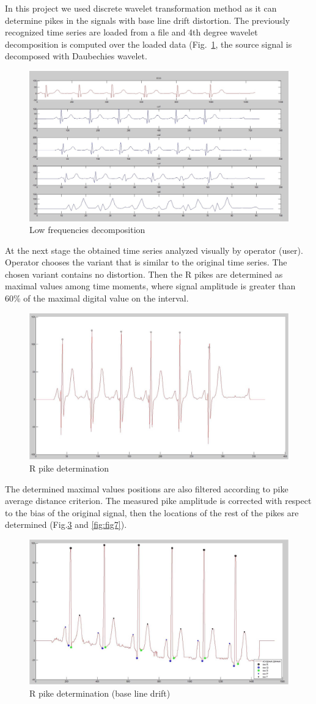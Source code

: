 \documentclass[runningheads]{AIIT}
\begin{document}
In this project we used discrete wavelet transformation method as it can determine pikes in the signals with base line drift distortion.  The previously recognized time series are loaded from a file and 4th degree wavelet decomposition is computed over the loaded data (Fig.~\ref{fig:decomp}, the source signal is decomposed with Daubechies wavelet.

\begin{figure}[htb]
  \centering
    \includegraphics[width=0.5\linewidth] {images/Decomposition.jpg}
  \caption{Low frequencies decomposition}
  \label{fig:decomp}
\end{figure}

At the next stage the obtained time series analyzed visually by operator (user).  Operator chooses the variant that is similar to the original time series.  The chosen variant contains no distortion.  Then the R pikes are determined as maximal values among time moments, where signal amplitude is greater than 60\% of the maximal digital value on the interval.

\begin{figure}[htb]
  \centering
    \includegraphics[width=0.5\linewidth] {images/R-pike.jpg}
  \caption{R pike determination}
  \label{fig:determ-R}
\end{figure}
The determined maximal values positions are also filtered according to pike average distance criterion.  The measured pike amplitude is corrected with respect to the bias of the original signal, then the locations of the rest of the pikes are determined (Fig.\ref{fig:fig6} and \ref{fig:fig7}).

\begin{figure}[htb]
  \centering
    \includegraphics[width=0.5\linewidth] {images/Drift.jpg}
  \caption{R pike determination (base line drift)}
  \label{fig:fig6}
\end{figure}
\end{document}
